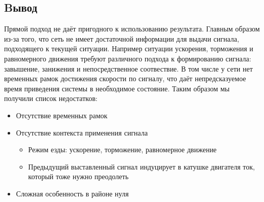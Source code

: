 \documentclass[14pt]{extreport}
\begin{document}
            \subsection{Bывод}
                Прямой подход не даёт пригодного к использованию результата. Главным образом из-за того, что сеть не имеет достаточной информации для выдачи сигнала, подходящего к текущей ситуации. Например ситуации ускорения, торможения и равномерного движения требуют различного подхода к формированию сигнала: завышение, занижения и непосредственное соотвествие. В том числе у сети нет временных рамок достижения скорости по сигналу, что даёт непредсказуемое время приведения системы в необходимое состояние. Таким образом мы получили список недостатков:
                \begin{itemize}
                  \item Отсутствие временных рамок
                  \item Отсутствие контекста применения сигнала
                      \begin{itemize}
                        \item Режим езды: ускорение, торможение, равномерное движение
                        \item Предыдущий выставленный сигнал индуцирует в катушке двигателя ток, который тоже нужно преодолеть
                      \end{itemize}
                  \item Сложная особенность в районе нуля
                \end{itemize}
\end{document}
